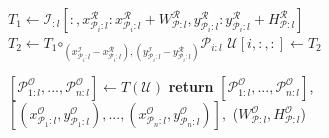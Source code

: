 \begin{algorithm}
\begin{algorithmic}[1]
    \label{alg:line:memcpy_loop}
        \State $T_1 \gets \mathcal{I}_{:l}[:,x^\mathcal{R}_{\mathcal{P}_i:l}:x^\mathcal{R}_{\mathcal{P}_i:l}+W^\mathcal{R}_{\mathcal{P}:l},y^\mathcal{R}_{\mathcal{P}_i:l}:y^\mathcal{R}_{\mathcal{P}_i:l}+H^\mathcal{R}_{\mathcal{P}:l}]$ 
        \State $T_2 \gets T_1 \bm\circ_{(x^\mathcal{I}_{\mathcal{P}_i:l}-x^\mathcal{R}_{\mathcal{P}_i:l}),(y^\mathcal{I}_{\mathcal{P}_i:l}-y^\mathcal{R}_{\mathcal{P}_i:l})} \mathcal{P}_{i:l}$
        \State $\mathcal{U}[i,:,:] \gets T_2$
    \EndFor

    \State $[\mathcal{P}^\mathcal{O}_{1:l},...,\mathcal{P}^\mathcal{O}_{n:l}] \gets T(\mathcal{U})$ 
    \State \textbf{return} $[\mathcal{P}^\mathcal{O}_{1:l},...,\mathcal{P}^\mathcal{O}_{n:l}]$,
    \State \hspace*{5mm} $[(x^\mathcal{O}_{\mathcal{P}_1:l},y^\mathcal{O}_{\mathcal{P}_1:l}),...,(x^\mathcal{O}_{\mathcal{P}_n:l},y^\mathcal{O}_{\mathcal{P}_n:l})],$ ($W^\mathcal{O}_{\mathcal{P}:l},H^\mathcal{O}_{\mathcal{P}:l}$) 
    \EndProcedure
    \end{algorithmic}

    


\end{algorithm}
